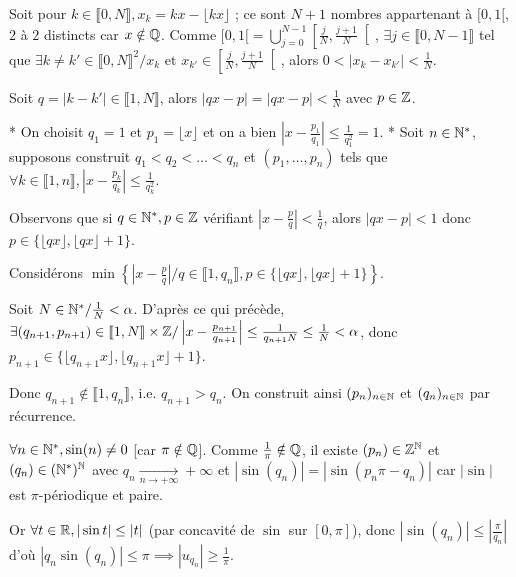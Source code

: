 \begin{solution}
Soit pour $k \in \llbracket 0, N \rrbracket, x_k = k x - \lfloor k x \rfloor$ ; ce sont $N+1$ nombres appartenant à $[0, 1[$, $2$ à $2$ distincts car $x \notin \mathbb Q$.
Comme $[0, 1[ = \bigcup_{j=0}^{N-1} \left[ \frac{j}{N}, \frac{j+1}{N} \right[$, $\exists j \in \llbracket 0, N-1 \rrbracket$ tel que $\exists k \neq k' \in \llbracket 0, N \rrbracket^2 / x_k \text{ et } x_{k'} \in \left[ \frac{j}{N}, \frac{j+1}{N} \right[$, alors $0 < |x_k - x_{k'}| < \frac{1}{N}$.

Soit $q = |k - k'| \in \llbracket 1, N \rrbracket$, alors $|q x - p| = |q x - p| < \frac{1}{N}$ avec $p \in \mathbb Z$.

* On choisit $q_1 = 1$ et $p_1 = \lfloor x \rfloor$ et on a bien $\left| x - \frac{p_1}{q_1} \right| \leq \frac{1}{q_1^2} = 1$.
* Soit $n \in \mathbb N^*$, supposons construit $q_1 < q_2 < \dots < q_n$ et $(p_1, \dots, p_n)$ tels que $\forall k \in \llbracket 1, n \rrbracket, \left| x - \frac{p_k}{q_k} \right| \leq \frac{1}{q_k^2}$.

Observons que si $q \in \mathbb N^*, p \in \mathbb Z$ vérifiant $\left| x - \frac{p}{q} \right| < \frac{1}{q}$, alors $|q x - p| < 1$ donc $p \in \{ \lfloor q x \rfloor, \lfloor q x \rfloor + 1 \}$.

Considérons $\min \left\{ \left| x - \frac{p}{q} \right| / q \in \llbracket 1, q_n \rrbracket, p \in \{ \lfloor q x \rfloor, \lfloor q x \rfloor + 1 \} \right\}$.

Soit $N \in \mathbb N^* / \frac{1}{N} < \alpha$.
D'après ce qui précède, $\exists (q_{n+1}, p_{n+1}) \in \llbracket 1, N \rrbracket \times \mathbb Z / \left| x - \frac{p_{n+1}}{q_{n+1}} \right| \leq \frac{1}{q_{n+1} N} \leq \frac{1}{N} < \alpha$, donc $p_{n+1} \in \{ \lfloor q_{n+1} x \rfloor, \lfloor q_{n+1} x \rfloor + 1 \}$.

Donc $q_{n+1} \notin \llbracket 1, q_n \rrbracket$, i.e. $q_{n+1} > q_n$.
On construit ainsi $(p_n)_{n \in \mathbb N}$ et $(q_n)_{n \in \mathbb N}$ par récurrence.

$\forall n \in \mathbb N^*, \sin(n) \neq 0$ [car $\pi \notin \mathbb Q$].
Comme $\frac{1}{\pi} \notin \mathbb Q$, il existe $(p_n) \in \mathbb Z^\mathbb N$ et $(q_n) \in (\mathbb N^*)^\mathbb N$ avec $q_n \xrightarrow[n \to +\infty]{} +\infty$ et $|\sin(q_n)| = |\sin(p_n \pi - q_n)|$ car $|\sin|$ est $\pi$-périodique et paire.

Or $\forall t \in \mathbb R, |\sin t| \leq |t|$ (par concavité de $\sin$ sur $[0, \pi]$), donc $|\sin(q_n)| \leq \left| \frac{\pi}{q_n} \right|$ d'où $|q_n \sin(q_n)| \leq \pi \implies |u_{q_n}| \geq \frac{1}{\pi}$.


\end{solution}
